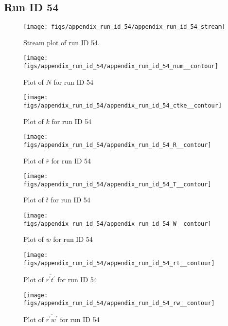 \subsection{Run ID 54}
\begin{figure}[H]
\centering
\texttt{[image: figs/appendix\_run\_id\_54/appendix\_run\_id\_54\_stream]}
\caption{Stream plot of run ID 54.}
\label{fig:appendix_run_id_54_stream}
\end{figure}


\begin{figure}[H]
\centering
\texttt{[image: figs/appendix\_run\_id\_54/appendix\_run\_id\_54\_num\_\_contour]}
\caption{Plot of $N$ for run ID 54}
\label{fig:appendix_run_id_54_num__contour}
\end{figure}


\begin{figure}[H]
\centering
\texttt{[image: figs/appendix\_run\_id\_54/appendix\_run\_id\_54\_ctke\_\_contour]}
\caption{Plot of $k$ for run ID 54}
\label{fig:appendix_run_id_54_ctke__contour}
\end{figure}


\begin{figure}[H]
\centering
\texttt{[image: figs/appendix\_run\_id\_54/appendix\_run\_id\_54\_R\_\_contour]}
\caption{Plot of $\overline{r}$ for run ID 54}
\label{fig:appendix_run_id_54_R__contour}
\end{figure}


\begin{figure}[H]
\centering
\texttt{[image: figs/appendix\_run\_id\_54/appendix\_run\_id\_54\_T\_\_contour]}
\caption{Plot of $\overline{t}$ for run ID 54}
\label{fig:appendix_run_id_54_T__contour}
\end{figure}


\begin{figure}[H]
\centering
\texttt{[image: figs/appendix\_run\_id\_54/appendix\_run\_id\_54\_W\_\_contour]}
\caption{Plot of $\overline{w}$ for run ID 54}
\label{fig:appendix_run_id_54_W__contour}
\end{figure}


\begin{figure}[H]
\centering
\texttt{[image: figs/appendix\_run\_id\_54/appendix\_run\_id\_54\_rt\_\_contour]}
\caption{Plot of $\overline{r^\prime t^\prime}$ for run ID 54}
\label{fig:appendix_run_id_54_rt__contour}
\end{figure}


\begin{figure}[H]
\centering
\texttt{[image: figs/appendix\_run\_id\_54/appendix\_run\_id\_54\_rw\_\_contour]}
\caption{Plot of $\overline{r^\prime w^\prime}$ for run ID 54}
\label{fig:appendix_run_id_54_rw__contour}
\end{figure}



